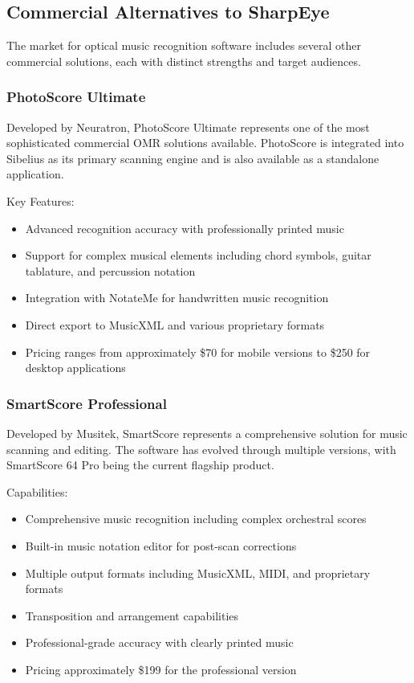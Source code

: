 \subsection{Commercial Alternatives to SharpEye}

The market for optical music recognition software includes several other commercial solutions, each with distinct strengths and target audiences.

\subsubsection{PhotoScore Ultimate}
Developed by Neuratron, PhotoScore Ultimate represents one of the most sophisticated commercial OMR solutions available. PhotoScore is integrated into Sibelius as its primary scanning engine and is also available as a standalone application.

Key Features:
\begin{itemize}
    \item Advanced recognition accuracy with professionally printed music
    \item Support for complex musical elements including chord symbols, guitar tablature, and percussion notation
    \item Integration with NotateMe for handwritten music recognition
    \item Direct export to MusicXML and various proprietary formats
    \item Pricing ranges from approximately \$70 for mobile versions to \$250 for desktop applications
\end{itemize}

\subsubsection{SmartScore Professional}
Developed by Musitek, SmartScore represents a comprehensive solution for music scanning and editing. The software has evolved through multiple versions, with SmartScore 64 Pro being the current flagship product.

Capabilities:
\begin{itemize}
    \item Comprehensive music recognition including complex orchestral scores
    \item Built-in music notation editor for post-scan corrections
    \item Multiple output formats including MusicXML, MIDI, and proprietary formats
    \item Transposition and arrangement capabilities
    \item Professional-grade accuracy with clearly printed music
    \item Pricing approximately \$199 for the professional version
\end{itemize}

